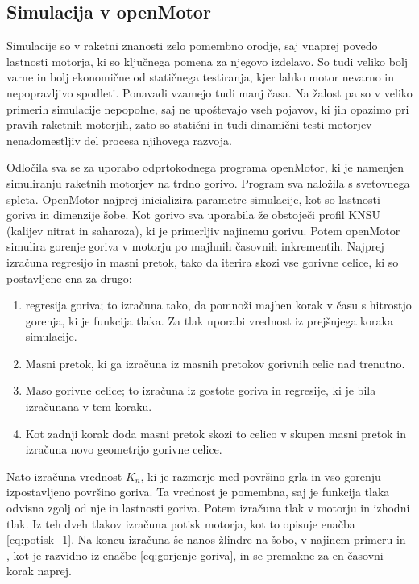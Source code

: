 \documentclass[titlepage, a4paper, twoside, final, 12pt]{article}
\begin{document}
			\subsection{Simulacija v openMotor}
			Simulacije so v raketni znanosti zelo pomembno orodje, saj vnaprej povedo lastnosti motorja, ki so ključnega pomena za njegovo izdelavo.
			So tudi veliko bolj varne in bolj ekonomične od statičnega testiranja, kjer lahko motor nevarno in nepopravljivo spodleti.
			Ponavadi vzamejo tudi manj časa. Na žalost pa so v veliko primerih simulacije nepopolne, saj ne upoštevajo vseh pojavov, ki jih opazimo pri pravih raketnih motorjih,
			zato so statični in tudi dinamični testi motorjev nenadomestljiv del procesa njihovega razvoja.

			Odločila sva se za uporabo odprtokodnega programa openMotor, ki je namenjen simuliranju raketnih motorjev na trdno gorivo.
			Program sva naložila s svetovnega spleta.\cite{openMotor}
			OpenMotor najprej inicializira parametre simulacije, kot so lastnosti goriva in dimenzije šobe. Kot gorivo sva uporabila že obstoječi profil KNSU (kalijev nitrat in saharoza), ki je primerljiv najinemu gorivu.
			Potem openMotor simulira gorenje goriva v motorju po majhnih časovnih inkrementih. Najprej izračuna regresijo in masni pretok, tako da iterira skozi vse gorivne celice, ki so postavljene ena za drugo:
			\cite{openMotor}
			\begin{enumerate}
				\item regresija goriva; to izračuna tako, da pomnoži majhen korak v času s hitrostjo gorenja, ki je funkcija tlaka.
					Za tlak uporabi vrednost iz prejšnjega koraka simulacije.
				\item Masni pretok, ki ga izračuna iz masnih pretokov gorivnih celic nad trenutno.
				\item Maso gorivne celice; to izračuna iz gostote goriva in regresije, ki je bila izračunana v tem koraku.
				\item Kot zadnji korak doda masni pretok skozi to celico v skupen masni pretok in izračuna novo geometrijo gorivne celice.
			\end{enumerate}

			Nato izračuna vrednost $K_n$, ki je razmerje med površino grla in vso gorenju izpostavljeno površino goriva. Ta vrednost je pomembna,
			saj je funkcija tlaka odvisna zgolj od nje in lastnosti goriva.\cite{openMotor} Potem izračuna tlak v motorju in izhodni tlak.
			Iz teh dveh tlakov izračuna potisk motorja, kot to opisuje enačba \ref{eq:potisk_1}.
			Na koncu izračuna še nanos žlindre na šobo, v najinem primeru  in , kot je razvidno iz enačbe \ref{eq:gorjenje-goriva}, in se premakne za en časovni korak naprej. 
\end{document}

